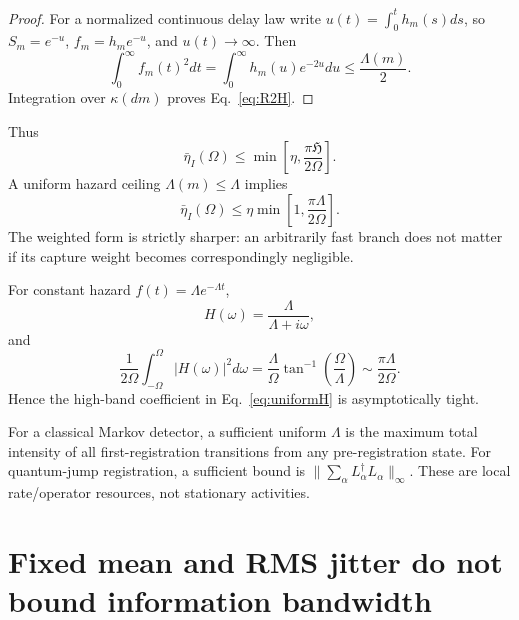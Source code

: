 \documentclass[aps,prapplied,preprint,nofootinbib]{revtex4-2}
\newcommand{\Hcap}{\mathfrak H}
\begin{document}
\begin{proof}
For a normalized continuous delay law write $u(t)=\int_0^th_m(s)ds$, so $S_m=e^{-u}$, $f_m=h_me^{-u}$, and $u(t)\to\infty$. Then
\begin{equation}
\int_0^\infty f_m(t)^2dt
=\int_0^\infty h_m(u)e^{-2u}du
\le\frac{\Lambda(m)}{2}.
\end{equation}
Integration over $\kappa(dm)$ proves Eq.~\eqref{eq:R2H}.
\end{proof}

Thus
\begin{equation}
\boxed{
\bar\eta_I(\Omega)
\le\min\left[\eta,\frac{\pi\Hcap}{2\Omega}\right].}
\label{eq:Hbound}
\end{equation}
A uniform hazard ceiling $\Lambda(m)\le\Lambda$ implies
\begin{equation}
\bar\eta_I(\Omega)\le
\eta\min\left[1,\frac{\pi\Lambda}{2\Omega}\right].
\label{eq:uniformH}
\end{equation}
The weighted form is strictly sharper: an arbitrarily fast branch does not matter if its capture weight becomes correspondingly negligible.

For constant hazard $f(t)=\Lambda e^{-\Lambda t}$,
\begin{equation}
H(\omega)=\frac{\Lambda}{\Lambda+i\omega},
\end{equation}
and
\begin{equation}
\frac{1}{2\Omega}\int_{-\Omega}^{\Omega}|H(\omega)|^2d\omega
=\frac{\Lambda}{\Omega}\tan^{-1}\!\left(\frac{\Omega}{\Lambda}\right)
\sim\frac{\pi\Lambda}{2\Omega}.
\end{equation}
Hence the high-band coefficient in Eq.~\eqref{eq:uniformH} is asymptotically tight.

For a classical Markov detector, a sufficient uniform $\Lambda$ is the maximum total intensity of all first-registration transitions from any pre-registration state. For quantum-jump registration, a sufficient bound is $\|\sum_\alpha L_\alpha^\dagger L_\alpha\|_\infty$. These are local rate/operator resources, not stationary activities.

\section{Fixed mean and RMS jitter do not bound information bandwidth}
\end{document}
